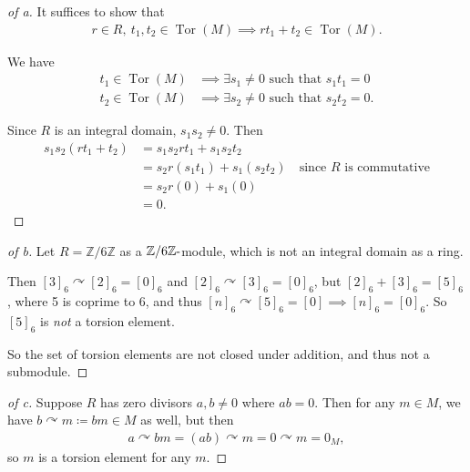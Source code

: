 \begin{solution}

\envlist

\begin{proof}[of a]

It suffices to show that
\begin{align*}
r\in R, ~t_1, t_2\in \operatorname{Tor}(M) \implies rt_1 + t_2 \in \operatorname{Tor}(M)
.\end{align*}

We have
\begin{align*}
t_1 \in \operatorname{Tor}(M) &\implies \exists s_1 \neq 0 \text{ such that } s_1 t_1  = 0 \\
t_2 \in \operatorname{Tor}(M) &\implies \exists s_2 \neq 0 \text{ such that } s_2 t_2  = 0 
.\end{align*}

Since \(R\) is an integral domain, \(s_1 s_2 \neq 0\). Then
\begin{align*}
s_1 s_2(rt_1 + t_2) 
&= s_1 s_2 r t_1 + s_1 s_2t_2 \\
&= s_2 r (s_1 t_1) + s_1 (s_2 t_2)  \quad\text{since $R$ is commutative} \\
&=  s_2 r(0) + s_1(0) \\
&= 0
.\end{align*}

\end{proof}

\begin{proof}[of b]

Let \(R = {\mathbb{Z}}/6{\mathbb{Z}}\) as a
\({\mathbb{Z}}/6{\mathbb{Z}}{\hbox{-}}\)module, which is not an integral
domain as a ring.

Then \([3]_6\curvearrowright[2]_6 = [0]_6\) and
\([2]_6\curvearrowright[3]_6 = [0]_6\), but \([2]_6 + [3]_6 = [5]_6\),
where 5 is coprime to 6, and thus
\([n]_6\curvearrowright[5]_6 = [0] \implies [n]_6 = [0]_6\). So
\([5]_6\) is \emph{not} a torsion element.

So the set of torsion elements are not closed under addition, and thus
not a submodule.

\end{proof}

\begin{proof}[of c]

Suppose \(R\) has zero divisors \(a,b \neq 0\) where \(ab = 0\). Then
for any \(m\in M\), we have \(b\curvearrowright m \coloneqq bm \in M\)
as well, but then
\begin{align*}
a\curvearrowright bm = (ab)\curvearrowright m = 0\curvearrowright m = 0_M
,\end{align*}
so \(m\) is a torsion element for any \(m\).

\end{proof}

\end{solution}

